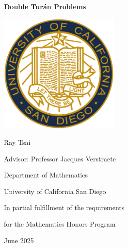 \begin{titlepage}
    \begin{center}
        \Huge
        \textbf{Double Tur\'{a}n Problems}

        \vspace{1.5cm}
        \includegraphics[width=60mm]{images/University-of-California-San-Diego-Logo.png}

        \vspace{1.5cm}
        \LARGE
        Ray Tsai

        \vspace{0.2cm}
        Advisor: Professor Jacques Verstraete
        
        \vspace{1cm}
        \Large
        Department of Mathematics
        
        \vspace{0.1cm}
        University of California San Diego

        \vspace{1cm}
        In partial fulfillment of the requirements

        \vspace{0.1cm}
        for the Mathematics Honors Program
        
        \vspace{0.3cm}
        June 2025
    \end{center}
    
\end{titlepage}
